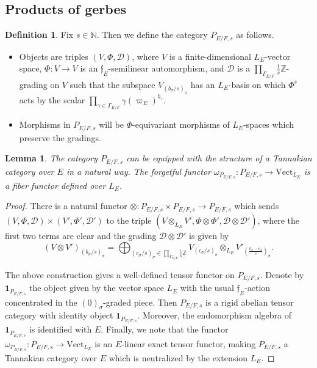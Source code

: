 \documentclass[11pt]{amsart}
\newtheorem{lem}[thm]{Lemma}
\theoremstyle{definition}
\newtheorem{defn}[thm]{Definition}
\newcommand{\mc}{\mathcal}
\newcommand{\Z}{\mathbb{Z}}
\newcommand{\mf}{\mathfrak}
\newcommand{\N}{\mathbb{N}}
\newcommand{\Vect}{\mathrm{Vect}}
\begin{document}
\subsection{Products of gerbes}\label{sec:prod}
\begin{defn}
Fix $s \in \N$. Then we define the category $P_{E/F, s}$ as follows. 
\begin{itemize}
    \item Objects are triples $(V, \Phi, \mc{D})$, where $V$ is a finite-dimensional $L_{E}$-vector space, $\Phi \colon V \to V$ is an $\mf{f}_{E}$-semilinear automorphism, and $\mc{D}$ is a $\prod\limits_{\Gamma_{E/F}} \frac{1}{s}\Z$-grading on $V$ such that the subspace $V_{(b_{\sigma}/s)_{\sigma}}$ has an $L_{E}$-basis on which $\Phi^{s}$ acts by the scalar $\prod\limits_{\gamma \in \Gamma_{E/F}} \gamma(\varpi_{E})^{b_{\gamma}}$.
    \item  Morphisms in $P_{E/F,s}$ will be $\Phi$-equivariant morphisms of $L_{E}$-spaces which preserve the gradings.
\end{itemize}
\end{defn}
\begin{lem}
 The category $P_{E/F, s}$ can be equipped with the structure of a Tannakian category over $E$ in a natural way. The forgetful functor $\omega_{P_{E/F, s}}: P_{E/F, s} \to \Vect_{L_E}$ is a fiber functor defined over $L_E$.
\end{lem}
\begin{proof}
 There is a natural functor $\otimes \colon P_{E/F,s} \times P_{E/F,s} \to P_{E/F,s}$ which sends $(V, \Phi, \mc{D}) \times (V', \Phi', \mc{D}')$ to the triple $(V \otimes_{L_{E}} V', \Phi \otimes \Phi', \mc{D} \otimes \mc{D}')$, where the first two terms are clear and the grading $\mc{D} \otimes \mc{D}'$ is given by 
$$(V \otimes V')_{(b_{\sigma}/s)_{\sigma}} = \bigoplus_{(c_{\sigma}/s)_{\sigma} \in \prod\limits_{\Gamma_{E/F}} \frac{1}{s}\Z} V_{(c_{\sigma}/s)_{\sigma}} \otimes_{L_{E}} V'_{(\frac{b_{\sigma} - c_{\sigma}}{s})_{\sigma}}.$$

The above construction gives a well-defined tensor functor on $P_{E/F,s}$. Denote by $\textbf{1}_{P_{E/F,s}}$ the object given by the vector space $L_{E}$ with the usual $\mf{f}_{E}$-action concentrated in the $(0)_{\sigma}$-graded piece. Then $P_{E/F,s}$  is a rigid abelian tensor category with identity object $\textbf{1}_{P_{E/F,s}}$. Moreover, the endomorphism algebra of $\textbf{1}_{P_{E/F,s}}$ is identified with $E$. Finally, we note that the  functor $\omega_{P_{E/F,s}} \colon P_{E/F,s} \to \text{Vect}_{L_{E}}$ is an $E$-linear exact tensor functor, making $P_{E/F,s}$ a Tannakian category over $E$ which is neutralized by the extension $L_{E}$. 
\end{proof}
\end{document}
